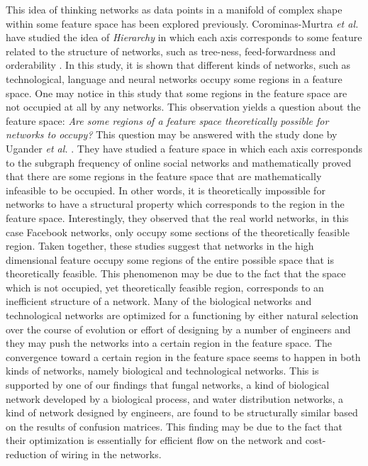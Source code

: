 This idea of thinking networks as data points in a manifold of complex shape within some feature space has been explored previously. Corominas-Murtra \textit{et al.} have studied the idea of \textit{Hierarchy} in which each axis corresponds to some feature related to the structure of networks, such as tree-ness, feed-forwardness and orderability \cite{Hierarchy}. In this study, it is shown that different kinds of networks, such as technological, language and neural networks occupy some regions in a feature space. One may notice in this study that some regions in the feature space are not occupied at all by any networks. This observation yields a question about the feature space: \textit{Are some regions of a feature space theoretically possible for networks to occupy?} This question may be answered with the study done by Ugander \textit{et al.} \cite{Ugander:2013}. They have studied a feature space in which each axis corresponds to the subgraph frequency of online social networks and mathematically proved that there are some regions in the feature space that are mathematically infeasible to be occupied. In other words, it is theoretically impossible for networks to have a structural property which corresponds to the region in the feature space. Interestingly, they observed that the real world networks, in this case Facebook networks, only occupy some sections of the theoretically feasible region. Taken together, these studies suggest that networks in the high dimensional feature occupy some regions of the entire possible space that is theoretically feasible. This phenomenon may be due to the fact that the space which is not occupied, yet theoretically feasible region, corresponds to an inefficient structure of a network. Many of the biological networks and technological networks are optimized for a functioning by either natural selection over the course of evolution or effort of designing by a number of engineers and they may push the networks into a certain region in the feature space. The convergence toward a certain region in the feature space seems to happen in both kinds of networks, namely biological and technological networks. This is supported by one of our findings that fungal networks, a kind of biological network developed by a biological process, and water distribution networks, a kind of network designed by engineers, are found to be structurally similar based on the results of confusion matrices. This finding may be due to the fact that their optimization is essentially for efficient flow on the network and cost-reduction of wiring in the networks.
 
